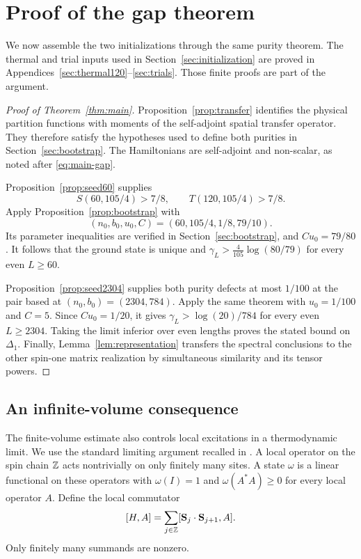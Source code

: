 \section{Proof of the gap theorem}\label{sec:assembly}

We now assemble the two initializations through the same purity theorem.
The thermal and trial inputs used in Section~\ref{sec:initialization}
are proved in Appendices~\ref{sec:thermal120}--\ref{sec:trials}.
Those finite proofs are part of the argument.

\begin{proof}[Proof of Theorem~\ref{thm:main}]
Proposition~\ref{prop:transfer} identifies the physical partition
functions with moments of the self-adjoint spatial transfer operator.
They therefore satisfy the hypotheses used to define both purities in
Section~\ref{sec:bootstrap}. The Hamiltonians are self-adjoint and
non-scalar, as noted after \eqref{eq:main-gap}.

Proposition~\ref{prop:seed60} supplies
\[
 S(60,105/4)>7/8,\qquad T(120,105/4)>7/8.
\]
Apply Proposition~\ref{prop:bootstrap} with
\[
 (n_0,b_0,u_0,C)=(60,105/4,1/8,79/10).
\]
Its parameter inequalities are verified in
Section~\ref{sec:bootstrap}, and $Cu_0=79/80$.
It follows that the ground state is unique and
$\gamma_L>\frac4{105}\log(80/79)$ for every even $L\ge60$.

Proposition~\ref{prop:seed2304} supplies both purity defects at most
$1/100$ at the pair based at $(n_0,b_0)=(2304,784)$.
Apply the same theorem with $u_0=1/100$ and $C=5$.
Since $Cu_0=1/20$, it gives
$\gamma_L>\log(20)/784$ for every even $L\ge2304$.
Taking the limit inferior over even lengths proves the stated bound
on $\Delta_1$. Finally, Lemma~\ref{lem:representation} transfers the
spectral conclusions to the other spin-one matrix realization by
simultaneous similarity and its tensor powers.
\end{proof}

\subsection{An infinite-volume consequence}

The finite-volume estimate also controls local excitations in a
thermodynamic limit. We use the standard limiting argument recalled in
\cite[arXiv v4, End Matter, Definition~11 and Theorem~12]{Tasaki2025}.
A local operator on the spin chain $\mathbb Z$ acts nontrivially on only
finitely many sites. A state $\omega$ is a linear functional on these
operators with $\omega(I)=1$ and $\omega(A^*A)\ge0$ for every local
operator $A$. Define the local commutator
\[
 [H,A]=\sum_{j\in\mathbb Z}
 [\mathbf S_j\cdot\mathbf S_{j+1},A].
\]
Only finitely many summands are nonzero.

